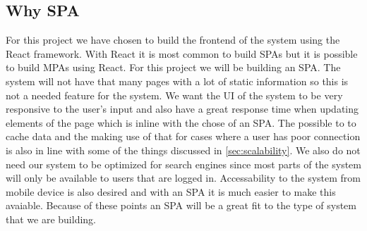 \subsection{Why SPA}
For this project we have chosen to build the frontend of the system using the React framework. 
With React it is most common to build SPAs but it is possible to build MPAs using React. 
For this project we will be building an SPA.
The system will not have that many pages with a lot of static information so this is not a needed feature for the system.
We want the UI of the system to be very responsive to the user's input and also have a great response time when updating elements of the page which is inline with the chose of an SPA.
The possible to to cache data and the making use of that for cases where a user has poor connection is also in line with some of the things discussed in \autoref{sec:scalability}.
We also do not need our system to be optimized for search engines since most parts of the system will only be available to users that are logged in.
Accessability to the system from mobile device is also desired and with an SPA it is much easier to make this avaiable. 
Because of these points an SPA will be a great fit to the type of system that we are building.
